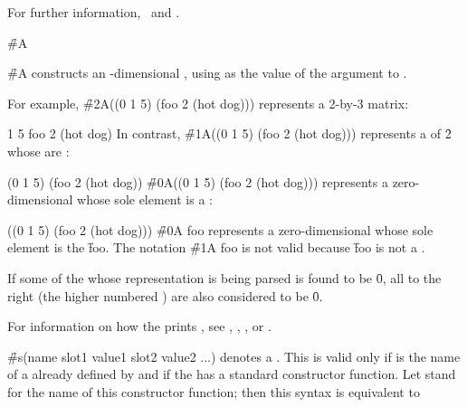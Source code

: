 For further information, 
\seesection\PrintingComplexes\ and \secref\SyntaxOfComplexes.

\endsubsubsection%


\f{\#A}

\f{\#A} constructs an -dimensional ,
using  as the value of the  argument
to .

For example, \f{\#2A((0 1 5) (foo 2 (hot dog)))} represents a 2-by-3 matrix:

       1       5
 foo     2       (hot dog)
\endcode
In contrast, \f{\#1A((0 1 5) (foo 2 (hot dog)))} 
represents a  of  \f{2} 
whose  are :

\code
 (0 1 5) (foo 2 (hot dog))
\endcode
\f{\#0A((0 1 5) (foo 2 (hot dog)))} represents a zero-dimensional
 whose sole element is a :

\code
 ((0 1 5) (foo 2 (hot dog)))
\endcode
\f{\#0A foo} represents 
a zero-dimensional  whose sole element is the 
 \f{foo}.
The notation \f{\#1A foo} is not valid because \f{foo} is
not a .

If some  of the 
whose representation is being parsed is found to be \f{0},
all  to the right 
(\ie the higher numbered )
are also considered to be \f{0}.

For information on how the  prints ,
see \secref\PrintingStrings,
    \secref\PrintingBitVectors,
    \secref\PrintingOtherVectors,
 or \secref\PrintingOtherArrays.

\endsubsubsection%



\f{\#s(name slot1 value1 slot2 value2 ...)}
denotes a .  This is valid only if  is the name
of a   already defined by  
and if the   has a standard constructor function.
Let  stand for the name of this constructor function;
then this syntax is equivalent to

